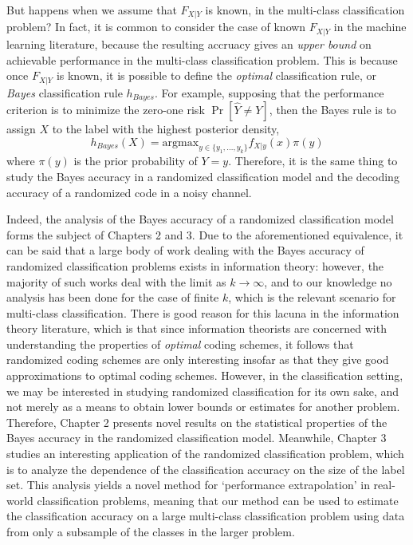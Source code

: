 But happens when we assume that $F_{X|Y}$ is known, in the multi-class
classification problem?  In fact, it is common to consider the case of
known $F_{X|Y}$ in the machine learning literature, because the
resulting accruacy gives an \emph{upper bound} on achievable
performance in the multi-class classification problem.  This is
because once $F_{X|Y}$ is known, it is possible to define the
\emph{optimal} classification rule, or \emph{Bayes} classification
rule $h_{Bayes}$.  For example, supposing that the performance
criterion is to minimize the zero-one risk $\Pr[\hat{Y} \neq Y]$, then
the Bayes rule is to assign $X$ to the label with the highest
posterior density,
\[
h_{Bayes}(X) = \text{argmax}_{y \in \{y_1, \hdots, y_k\}} f_{X|y}(x) \pi(y)
\]
where $\pi(y)$ is the prior probability of $Y = y$.  Therefore, it is
the same thing to study the Bayes accuracy in a randomized
classification model and the decoding accuracy of a randomized code in
a noisy channel.

Indeed, the analysis of the Bayes accuracy of a randomized
classification model forms the subject of Chapters 2 and 3.  Due to
the aforementioned equivalence, it can be said that a large body of
work dealing with the Bayes accuracy of randomized classification
problems exists in information theory: however, the majority of such
works deal with the limit as $k \to \infty$, and to our knowledge no
analysis has been done for the case of finite $k$, which is the
relevant scenario for multi-class classification.  There is good
reason for this lacuna in the information theory literature, which is
that since information theorists are concerned with understanding the
properties of \emph{optimal} coding schemes, it follows that
randomized coding schemes are only interesting insofar as that they
give good approximations to optimal coding schemes.  However, in the
classification setting, we may be interested in studying randomized
classification for its own sake, and not merely as a means to obtain
lower bounds or estimates for another problem.  Therefore, Chapter 2
presents novel results on the statistical properties of the Bayes
accuracy in the randomized classification model.  Meanwhile, Chapter 3
studies an interesting application of the randomized classification
problem, which is to analyze the dependence of the classification
accuracy on the size of the label set.  This analysis yields a novel
method for `performance extrapolation' in real-world classification
problems, meaning that our method can be used to estimate the
classification accuracy on a large multi-class classification problem
using data from only a subsample of the classes in the larger problem.
